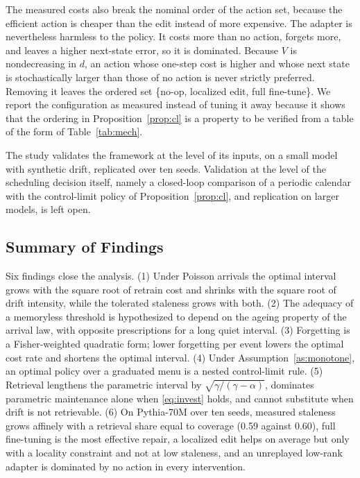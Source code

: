 \documentclass[journal]{IEEEtran}
\begin{document}
The measured costs also break the nominal order of the action set, because the efficient action is cheaper than the edit instead of more expensive. The adapter is nevertheless harmless to the policy. It costs more than no action, forgets more, and leaves a higher next-state error, so it is dominated. Because $V$ is nondecreasing in $d$, an action whose one-step cost is higher and whose next state is stochastically larger than those of no action is never strictly preferred. Removing it leaves the ordered set \{no-op, localized edit, full fine-tune\}. We report the configuration as measured instead of tuning it away because it shows that the ordering in Proposition~\ref{prop:cl} is a property to be verified from a table of the form of Table~\ref{tab:mech}.

The study validates the framework at the level of its inputs, on a small model with synthetic drift, replicated over ten seeds. Validation at the level of the scheduling decision itself, namely a closed-loop comparison of a periodic calendar with the control-limit policy of Proposition~\ref{prop:cl}, and replication on larger models, is left open.

\subsection{Summary of Findings}
Six findings close the analysis. (1) Under Poisson arrivals the optimal interval grows with the square root of retrain cost and shrinks with the square root of drift intensity, while the tolerated staleness grows with both. (2) The adequacy of a memoryless threshold is hypothesized to depend on the ageing property of the arrival law, with opposite prescriptions for a long quiet interval. (3) Forgetting is a Fisher-weighted quadratic form; lower forgetting per event lowers the optimal cost rate and shortens the optimal interval. (4) Under Assumption~\ref{as:monotone}, an optimal policy over a graduated menu is a nested control-limit rule. (5) Retrieval lengthens the parametric interval by $\sqrt{\gamma/(\gamma-\alpha)}$, dominates parametric maintenance alone when \eqref{eq:invest} holds, and cannot substitute when drift is not retrievable. (6) On Pythia-70M over ten seeds, measured staleness grows affinely with a retrieval share equal to coverage (0.59 against 0.60), full fine-tuning is the most effective repair, a localized edit helps on average but only with a locality constraint and not at low staleness, and an unreplayed low-rank adapter is dominated by no action in every intervention.
\end{document}

